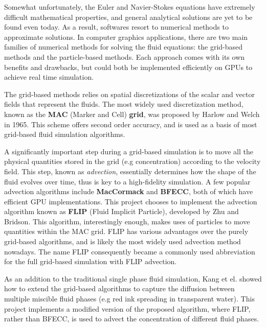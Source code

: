 Somewhat unfortunately, the Euler and Navier-Stokes equations have extremely difficult mathematical properties, and general analytical solutions are yet to be found even today. As a result, softwares resort to numerical methods to approximate solutions. In computer graphics applications, there are two main families of numerical methods for solving the fluid equations: the grid-based methods and the particle-based methods. Each approach comes with its own benefits and drawbacks, but could both be implemented efficiently on GPUs to achieve real time simulation.

The grid-based methods relies on spatial discretizations of the scalar and vector fields that represent the fluids. The most widely used discretization method, known as the \textbf{MAC} (Marker and Cell) \textbf{grid}, was proposed by Harlow and Welch \cite{harlow1965numerical} in 1965. This scheme offers second order accuracy, and is used as a basis of most grid-based fluid simulation algorithms. 

A significantly important step during a grid-based simulation is to move all the physical quantities stored in the grid (e.g concentration) according to the velocity field. This step, known as \textit{advection}, essentially determines how the shape of the fluid evolves over time, thus is key to a high-fidelity simulation. A few popular advection algorithms include \textbf{MacCormack}\cite{selle2008unconditionally} and \textbf{BFECC}\cite{kim2005flowfixer}, both of which have efficient GPU implementations\cite{chentanez2011real}\cite{xu2011interactive}. This project chooses to implement the advection algorithm known as \textbf{FLIP} (Fluid Implicit Particle)\cite{zhu2005animating}, developed by Zhu and Bridson. This algorithm, interestingly enough, makes uses of particles to move quantities within the MAC grid. FLIP has various advantages over the purely grid-based algorithms, and is likely the most widely used advection method nowadays. The name FLIP consequently became a commonly used abbreviation for the full grid-based simulation with FLIP advection.

As an addition to the traditional single phase fluid simulation, Kang et el.\cite{kang2010hybrid} showed how to extend the grid-based algorithms to capture the diffusion between multiple miscible fluid phases (e.g red ink spreading in transparent water). This project implements a modified version of the proposed algorithm, where FLIP, rather than BFECC, is used to advect the concentration of different fluid phases.



